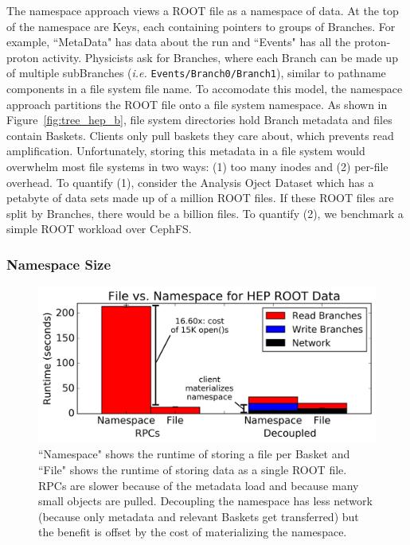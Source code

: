 The namespace approach views a ROOT file as a namespace of data. At the top of
the namespace are Keys, each containing pointers to groups of Branches. For
example, ``MetaData" has data about the run and ``Events" has all the
proton-proton activity. Physicists ask for Branches, where each Branch can be
made up of multiple subBranches ({\it i.e.} \texttt{Events/Branch0/Branch1}),
similar to pathname components in a file system file name.  To accomodate this
model, the namespace approach partitions the ROOT file onto a file system
namespace.  As shown in Figure~\ref{fig:tree_hep_b}, file system directories
hold Branch metadata and files contain Baskets. Clients only pull baskets
they care about, which prevents read amplification.  Unfortunately, storing
this metadata in a file system would overwhelm most file systems in two ways:
(1) too many inodes and (2) per-file overhead.  To quantify (1), consider the
Analysis Oject Dataset which has a petabyte of data sets made up of a million
ROOT files. If these ROOT files are split by Branches, there would be a billion
files. To quantify (2), we benchmark a simple ROOT workload over CephFS.


\subsubsection{Namespace Size}

\begin{figure}[tb]
\centering
  \includegraphics[width=1\linewidth]{figures/hep_runtime.png}
  \caption{ ``Namespace" shows the runtime of storing a file per Basket and
``File" shows the runtime of storing data as a single ROOT file. RPCs are
slower because of the metadata load and because many small objects are pulled.
Decoupling the namespace has less network (because only metadata and relevant
Baskets get transferred) but the benefit is offset by the cost of materializing
the namespace.} \label{fig:hep_runtime}
\end{figure}

